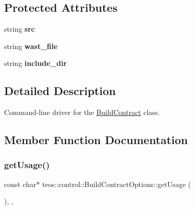 \subsection*{Protected Attributes}
\begin{DoxyCompactItemize}
\item 
\mbox{\label{classteos_1_1control_1_1_build_contract_options_a80b02b6769efd16a94bc83e7991dc7db}} 
string {\bfseries src}
\item 
\mbox{\label{classteos_1_1control_1_1_build_contract_options_ae9784fdf0854b5ee6d9e9b2edf0b0345}} 
string {\bfseries wast\+\_\+file}
\item 
\mbox{\label{classteos_1_1control_1_1_build_contract_options_a4e5b55589b7062925301c383f5bb8bab}} 
string {\bfseries include\+\_\+dir}
\end{DoxyCompactItemize}


\subsection{Detailed Description}
Command-\/line driver for the \mbox{\hyperlink{classteos_1_1control_1_1_build_contract}{Build\+Contract}} class. 

\subsection{Member Function Documentation}
\mbox{\label{classteos_1_1control_1_1_build_contract_options_ac45a323c2bc0c79b97b1d0d1d8afbf4f}} 
\subsubsection{\texorpdfstring{get\+Usage()}{getUsage()}}
{\footnotesize\ttfamily const char$\ast$ teos\+::control\+::\+Build\+Contract\+Options\+::get\+Usage (\begin{DoxyParamCaption}{ }\end{DoxyParamCaption})\hspace{0.3cm}{\ttfamily [inline]}, {\ttfamily [protected]}, {\ttfamily [virtual]}}



